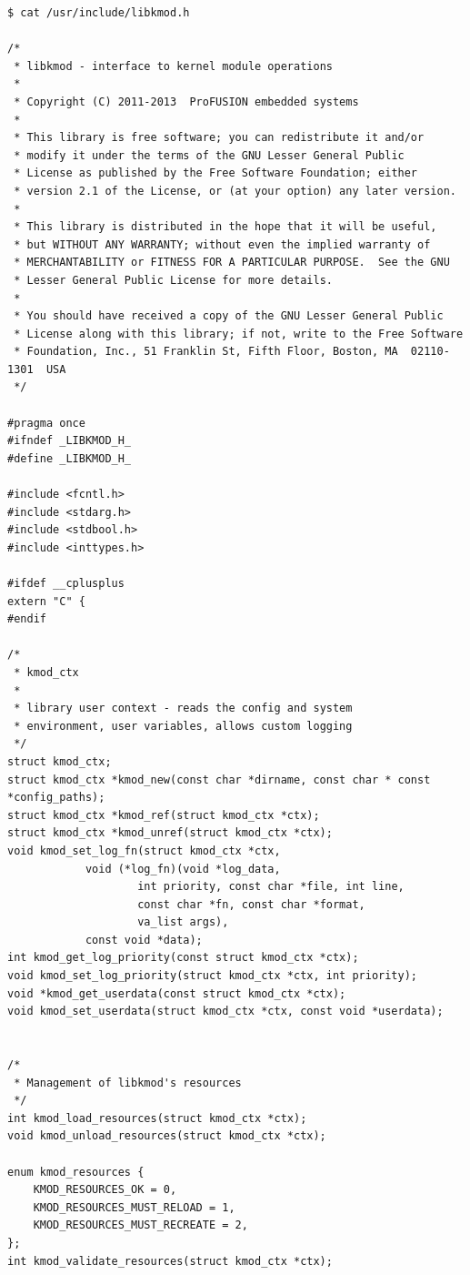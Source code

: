 {\begin{shaded}\begin{verbatim}
$ cat /usr/include/libkmod.h 

/*
 * libkmod - interface to kernel module operations
 *
 * Copyright (C) 2011-2013  ProFUSION embedded systems
 *
 * This library is free software; you can redistribute it and/or
 * modify it under the terms of the GNU Lesser General Public
 * License as published by the Free Software Foundation; either
 * version 2.1 of the License, or (at your option) any later version.
 *
 * This library is distributed in the hope that it will be useful,
 * but WITHOUT ANY WARRANTY; without even the implied warranty of
 * MERCHANTABILITY or FITNESS FOR A PARTICULAR PURPOSE.  See the GNU
 * Lesser General Public License for more details.
 *
 * You should have received a copy of the GNU Lesser General Public
 * License along with this library; if not, write to the Free Software
 * Foundation, Inc., 51 Franklin St, Fifth Floor, Boston, MA  02110-1301  USA
 */

#pragma once
#ifndef _LIBKMOD_H_
#define _LIBKMOD_H_

#include <fcntl.h>
#include <stdarg.h>
#include <stdbool.h>
#include <inttypes.h>

#ifdef __cplusplus
extern "C" {
#endif

/*
 * kmod_ctx
 *
 * library user context - reads the config and system
 * environment, user variables, allows custom logging
 */
struct kmod_ctx;
struct kmod_ctx *kmod_new(const char *dirname, const char * const *config_paths);
struct kmod_ctx *kmod_ref(struct kmod_ctx *ctx);
struct kmod_ctx *kmod_unref(struct kmod_ctx *ctx);
void kmod_set_log_fn(struct kmod_ctx *ctx,
            void (*log_fn)(void *log_data,
                    int priority, const char *file, int line,
                    const char *fn, const char *format,
                    va_list args),
            const void *data);
int kmod_get_log_priority(const struct kmod_ctx *ctx);
void kmod_set_log_priority(struct kmod_ctx *ctx, int priority);
void *kmod_get_userdata(const struct kmod_ctx *ctx);
void kmod_set_userdata(struct kmod_ctx *ctx, const void *userdata);


/*
 * Management of libkmod's resources
 */
int kmod_load_resources(struct kmod_ctx *ctx);
void kmod_unload_resources(struct kmod_ctx *ctx);

enum kmod_resources {
    KMOD_RESOURCES_OK = 0,
    KMOD_RESOURCES_MUST_RELOAD = 1,
    KMOD_RESOURCES_MUST_RECREATE = 2,
};
int kmod_validate_resources(struct kmod_ctx *ctx);


\end{verbatim}
\end{shaded}}
